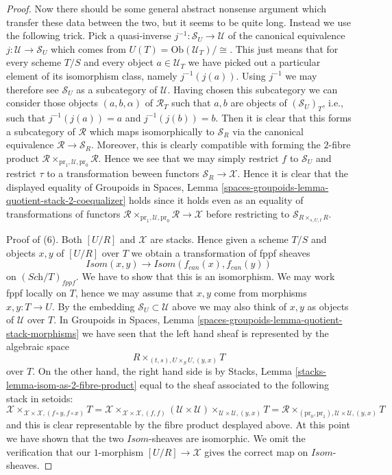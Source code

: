 \begin{proof}
\medskip\noindent
Now there should be some general abstract nonsense
argument which transfer these data between the two, but it seems to
be quite long. Instead we use the following trick.
Pick a quasi-inverse $j^{-1} : \mathcal{S}_U \to \mathcal{U}$
of the canonical equivalence $j : \mathcal{U} \to \mathcal{S}_U$ which comes
from $U(T) = \text{Ob}(\mathcal{U}_T)/\!\!\cong$.
This just means that for every scheme $T/S$ and every
object $a \in \mathcal{U}_T$ we have picked out a particular
element of its isomorphism class, namely $j^{-1}(j(a))$.
Using $j^{-1}$ we may therefore see $\mathcal{S}_U$
as a subcategory of $\mathcal{U}$. Having chosen this subcategory
we can consider those objects $(a, b, \alpha)$ of $\mathcal{R}_T$
such that $a, b$ are objects of $(\mathcal{S}_U)_T$, i.e., such
that $j^{-1}(j(a)) = a$ and $j^{-1}(j(b)) = b$. Then it is clear that
this forms a subcategory of $\mathcal{R}$ which maps isomorphically
to $\mathcal{S}_R$ via the canonical equivalence
$\mathcal{R} \to \mathcal{S}_R$. Moreover, this is clearly compatible
with forming the $2$-fibre product
$\mathcal{R} \times_{\text{pr}_1, \mathcal{U}, \text{pr}_0} \mathcal{R}$.
Hence we see that we may simply restrict
$f$ to $\mathcal{S}_U$ and restrict $\tau$ to a transformation
beween functors $\mathcal{S}_R \to \mathcal{X}$. Hence it is clear that
the displayed equality of
Groupoids in Spaces,
Lemma \ref{spaces-groupoids-lemma-quotient-stack-2-coequalizer}
holds since it holds even as an equality of transformations of functors
$\mathcal{R} \times_{\text{pr}_1, \mathcal{U}, \text{pr}_0} \mathcal{R}
\to \mathcal{X}$ before restricting to $\mathcal{S}_{R \times_{s, U, t} R}$.

\medskip\noindent
Proof of (6). Both $[U/R]$ and $\mathcal{X}$ are stacks.
Hence given a scheme $T/S$ and objects $x, y$ of $[U/R]$
over $T$ we obtain a transformation of fppf sheaves
$$
\mathit{Isom}(x, y) \longrightarrow \mathit{Isom}(f_{can}(x), f_{can}(y))
$$
on $(\textit{Sch}/T)_{fppf}$. We have to show that this is an
isomorphism. We may work fppf locally on $T$, hence we may assume that
$x, y$ come from morphisms $x, y : T \to U$. By the embedding
$\mathcal{S}_U \subset \mathcal{U}$ above we may also think of $x, y$ as
objects of $\mathcal{U}$ over $T$. In
Groupoids in Spaces,
Lemma \ref{spaces-groupoids-lemma-quotient-stack-morphisms}
we have seen that the left hand sheaf is represented by the algebraic space
$$
R \times_{(t, s), U \times_S U, (y, x)} T
$$
over $T$. On the other hand, the right hand
side is by
Stacks, Lemma \ref{stacks-lemma-isom-as-2-fibre-product}
equal to the sheaf associated to the following stack in setoids:
$$
\mathcal{X}
\times_{\mathcal{X} \times \mathcal{X}, (f \circ y, f \circ x)} T =
\mathcal{X}
\times_{\mathcal{X} \times \mathcal{X}, (f, f)}
(\mathcal{U} \times \mathcal{U})
\times_{\mathcal{U} \times \mathcal{U}, (y, x)} T =
\mathcal{R}
\times_{(\text{pr}_0, \text{pr}_1), \mathcal{U} \times \mathcal{U}, (y, x)} T
$$
and this is clear representable by the fibre product desplayed above.
At this point we have shown that the two $\mathit{Isom}$-sheaves
are isomorphic. We omit the verification that our $1$-morphism
$[U/R] \to \mathcal{X}$ gives the correct map on $\mathit{Isom}$-sheaves.
\end{proof}

